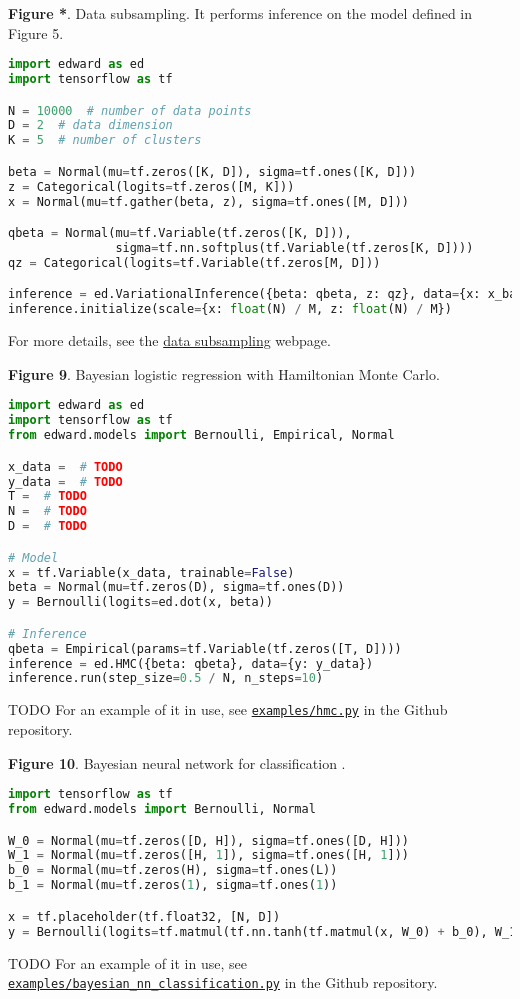\textbf{Figure *}. Data subsampling.
It performs inference on the model defined in Figure 5.
\begin{lstlisting}[language=python]
import edward as ed
import tensorflow as tf

N = 10000  # number of data points
D = 2  # data dimension
K = 5  # number of clusters

beta = Normal(mu=tf.zeros([K, D]), sigma=tf.ones([K, D]))
z = Categorical(logits=tf.zeros([M, K]))
x = Normal(mu=tf.gather(beta, z), sigma=tf.ones([M, D]))

qbeta = Normal(mu=tf.Variable(tf.zeros([K, D])),
               sigma=tf.nn.softplus(tf.Variable(tf.zeros[K, D])))
qz = Categorical(logits=tf.Variable(tf.zeros[M, D]))

inference = ed.VariationalInference({beta: qbeta, z: qz}, data={x: x_batch})
inference.initialize(scale={x: float(N) / M, z: float(N) / M})
\end{lstlisting}
For more details, see the
\href{/api/data-subsampling}{data subsampling} webpage.

\textbf{Figure 9}. Bayesian logistic regression with Hamiltonian Monte Carlo.
\begin{lstlisting}[language=python]
import edward as ed
import tensorflow as tf
from edward.models import Bernoulli, Empirical, Normal

x_data =  # TODO
y_data =  # TODO
T =  # TODO
N =  # TODO
D =  # TODO

# Model
x = tf.Variable(x_data, trainable=False)
beta = Normal(mu=tf.zeros(D), sigma=tf.ones(D))
y = Bernoulli(logits=ed.dot(x, beta))

# Inference
qbeta = Empirical(params=tf.Variable(tf.zeros([T, D])))
inference = ed.HMC({beta: qbeta}, data={y: y_data})
inference.run(step_size=0.5 / N, n_steps=10)
\end{lstlisting}
TODO
For an example of it in use, see
\href{https://github.com/blei-lab/edward/blob/master/examples/hmc.py}{\texttt{examples/hmc.py}}
in the Github repository.

\textbf{Figure 10}. Bayesian neural network for classification \citep{denker1987large}.
\begin{lstlisting}[language=python]
import tensorflow as tf
from edward.models import Bernoulli, Normal

W_0 = Normal(mu=tf.zeros([D, H]), sigma=tf.ones([D, H]))
W_1 = Normal(mu=tf.zeros([H, 1]), sigma=tf.ones([H, 1]))
b_0 = Normal(mu=tf.zeros(H), sigma=tf.ones(L))
b_1 = Normal(mu=tf.zeros(1), sigma=tf.ones(1))

x = tf.placeholder(tf.float32, [N, D])
y = Bernoulli(logits=tf.matmul(tf.nn.tanh(tf.matmul(x, W_0) + b_0), W_1) + b_1)
\end{lstlisting}
TODO
For an example of it in use, see
\href{https://github.com/blei-lab/edward/blob/master/examples/bayesian_nn_classification.py}{\texttt{examples/bayesian_nn_classification.py}}
in the Github repository.

